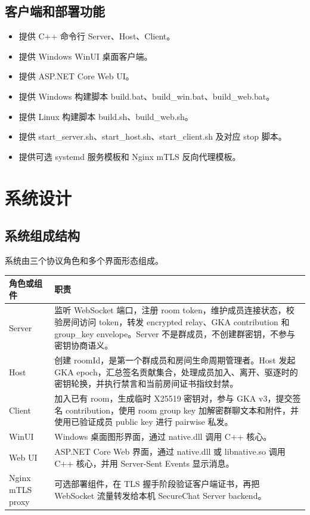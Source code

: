 \documentclass[UTF8,a4paper,12pt]{ctexart}
\begin{document}
\subsection{客户端和部署功能}

\begin{itemize}
  \item 提供 C++ 命令行 Server、Host、Client。
  \item 提供 Windows WinUI 桌面客户端。
  \item 提供 ASP.NET Core Web UI。
  \item 提供 Windows 构建脚本 build.bat、build\_win.bat、build\_web.bat。
  \item 提供 Linux 构建脚本 build.sh、build\_web.sh。
  \item 提供 start\_server.sh、start\_host.sh、start\_client.sh 及对应 stop 脚本。
  \item 提供可选 systemd 服务模板和 Nginx mTLS 反向代理模板。
\end{itemize}

\section{系统设计}

\subsection{系统组成结构}

系统由三个协议角色和多个界面形态组成。

\begin{longtable}{p{3cm}p{11cm}}
\toprule
角色或组件 & 职责 \\
\midrule
Server & 监听 WebSocket 端口，注册 room token，维护成员连接状态，校验房间访问 token，转发 encrypted relay、GKA contribution 和 group\_key envelope。Server 不是群成员，不创建群密钥，不参与密钥协商语义。\\
Host & 创建 roomId，是第一个群成员和房间生命周期管理者。Host 发起 GKA epoch，汇总签名贡献集合，处理成员加入、离开、驱逐时的密钥轮换，并执行禁言和当前房间证书指纹封禁。\\
Client & 加入已有 room，生成临时 X25519 密钥对，参与 GKA v3，提交签名 contribution，使用 room group key 加解密群聊文本和附件，并使用已验证成员 public key 进行 pairwise 私发。\\
WinUI & Windows 桌面图形界面，通过 native.dll 调用 C++ 核心。\\
Web UI & ASP.NET Core Web 界面，通过 native.dll 或 libnative.so 调用 C++ 核心，并用 Server-Sent Events 显示消息。\\
Nginx mTLS proxy & 可选部署组件，在 TLS 握手阶段验证客户端证书，再把 WebSocket 流量转发给本机 SecureChat Server backend。\\
\bottomrule
\end{longtable}
\end{document}
